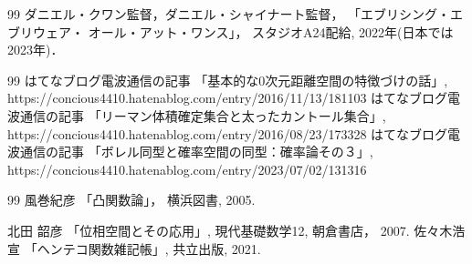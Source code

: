 \documentclass[leqno, a4paper, 12pt]{jsarticle}
\theoremstyle{definition}
\begin{document}
\renewcommand{\refname}{タイトルの参考にした映画}
	
\begin{thebibliography}{99}
ダニエル・クワン監督，ダニエル・シャイナート監督，
「エブリシング・エブリウェア・
     オール・アット・ワンス」，
スタジオA24配給, 
2022年(日本では2023年)．
\end{thebibliography}

\renewcommand{\refname}{はてなブログ「電波通信」}
	
\begin{thebibliography}{99}
はてなブログ電波通信の記事
「基本的な0次元距離空間の特徴づけの話」, https://concious4410.hatenablog.com/entry/2016/11/13/181103
はてなブログ電波通信の記事
「リーマン体積確定集合と太ったカントール集合」, 
https://concious4410.hatenablog.com/entry/2016/08/23/173328
はてなブログ電波通信の記事
「ボレル同型と確率空間の同型：確率論その３」, 
https://concious4410.hatenablog.com/entry/2023/07/02/131316
\end{thebibliography}

\renewcommand{\refname}{和文参考文献}

\begin{thebibliography}{99}
風巻紀彦
「凸関数論」，
横浜図書, 2005. 

北田 韶彦
「位相空間とその応用」, 
現代基礎数学12, 朝倉書店，
2007. 
佐々木浩宣
「ヘンテコ関数雑記帳」, 
共立出版, 
2021. 
\end{thebibliography}



\renewcommand{\refname}{一般の参考文献}


\end{document}
